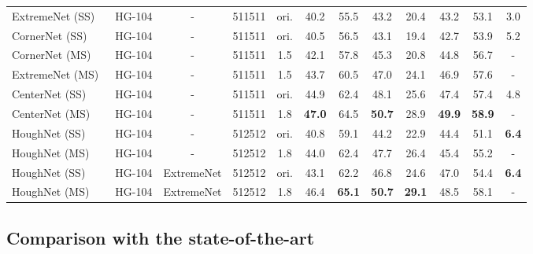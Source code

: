 \documentclass[runningheads]{llncs}
\begin{document}
\begin{table}[H]
{\begin{tabular}{llcccccccccc}
ExtremeNet (SS)~\cite{extremenet} & HG-104 & - &  511511 & ori. & 40.2 & 55.5 & 43.2 & 20.4 & 43.2 & 53.1  & 3.0 \\
CornerNet (SS)~\cite{cornernet} & HG-104 & -  & 511511 & ori.& 40.5 & 56.5 & 43.1 & 19.4 & 42.7 & 53.9 & 5.2 \\
CornerNet  (MS)~\cite{cornernet}& HG-104 & -  & 511511 & 1.5 & 42.1 & 57.8 & 45.3 & 20.8 & 44.8 & 56.7 & - \\
ExtremeNet (MS)~\cite{extremenet} & HG-104 & - &  511511 & 1.5 & 43.7 & 60.5 & 47.0 & 24.1 & 46.9 & 57.6  & - \\
CenterNet (SS)~\cite{centernet2} & HG-104 & - &  511511 & ori. & 44.9 & 62.4 & 48.1 & 25.6 &  47.4 & 57.4 & 4.8 \\
CenterNet (MS)~\cite{centernet2} & HG-104 & - & 511511 & 1.8 &  \textbf{47.0} &  64.5 &  \textbf{50.7} & 28.9 &   \textbf{49.9} &  \textbf{58.9}  & - \\
\midrule HoughNet (SS)& HG-104 & -  & 512512 & ori. &  40.8 &   59.1 &   44.2 & 22.9 &  44.4 & 51.1 & \textbf{6.4} \\
HoughNet (MS)& HG-104 & -  &  512512 & 1.8 & 44.0 &   62.4 &   47.7 & 26.4 &  45.4 & 55.2 & - \\
HoughNet (SS)& HG-104 &  ExtremeNet & 512512 & ori. &  43.1 & 62.2 & 46.8 & 24.6 &  47.0 & 54.4 & \textbf{6.4}  \\
HoughNet (MS)& HG-104 &  ExtremeNet &  512512 & 1.8 & 46.4 &  \textbf{65.1} &  \textbf{50.7} &  \textbf{29.1} &  48.5 &58.1 & -  \\
  \bottomrule \end{tabular}}
\label{table:stateoftheart-comp}
\end{table}


\subsection{Comparison with the state-of-the-art}
\label{sec:sota}
\end{document}
